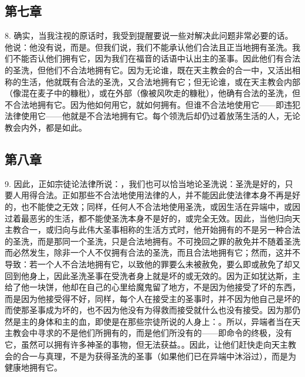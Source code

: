 
\subsection{第七章}

8. 确实，当我注视的原话时，我受到提醒要说一些对解决此问题非常必要的话。他说：他没有说，而是。但我们说，我们不能承认他们合法且正当地拥有圣洗。我们不能否认他们拥有它，因为我们在福音的话语中认出主的圣事。因此他们有合法的圣洗，但他们不合法地拥有它。因为无论谁，既在天主教会的合一中，又活出相称的生活，他就既有合法的圣洗，又合法地拥有它；但无论谁，或在天主教会内部（像混在麦子中的糠秕），或在外部（像被风吹走的糠秕），他确有合法的圣洗，但不合法地拥有它。因为他如何用它，就如何拥有。但谁不合法地使用它——即违犯法律使用它——他就是不合法地拥有它。每个领洗后却仍过着放荡生活的人，无论教会内外，都是如此。\par


\subsection{第八章}

9. 因此，正如宗徒论法律所说：，我们也可以恰当地论圣洗说：圣洗是好的，只要人用得合法。正如那些不合法地使用法律的人，并不能因此使法律本身不再是好的，也不能使之无效；同样，任何人不合法地使用圣洗，或因生活在异端中，或因过着最恶劣的生活，都不能使圣洗本身不是好的，或完全无效。因此，当他归向天主教合一，或归向与此伟大圣事相称的生活方式时，他开始拥有的不是另一种合法的圣洗，而是那同一个圣洗，只是合法地拥有。不可挽回之罪的赦免并不随着圣洗而必然发生，除非一个人不仅拥有合法的圣洗，而且合法地拥有它；然而，这并不导致：若一个人不合法地拥有它，以致他的罪要么未被赦免，要么即或赦免了却又回到他身上，因此圣洗圣事在受洗者身上就是坏的或无效的。因为正如犹达斯，主给了他一块饼，他却在自己的心里给魔鬼留了地方，不是因为他接受了坏的东西，而是因为他接受得不好，同样，每个人在接受主的圣事时，并不因为他自己是坏的而使那圣事成为坏的，也不因为他没有为得救而接受就什么也没有接受。因为那仍然是主的身体和主的血，即使是在那些宗徒所说的人身上：。所以，异端者当在天主教会中寻求的不是他们所拥有的，而是他们所没有的——即命令的终极，没有它，虽然可以拥有许多神圣的事物，但无法获益。。因此，让他们赶快走向天主教会的合一与真理，不是为获得圣洗的圣事（如果他们已在异端中沐浴过），而是为健康地拥有它。\par

